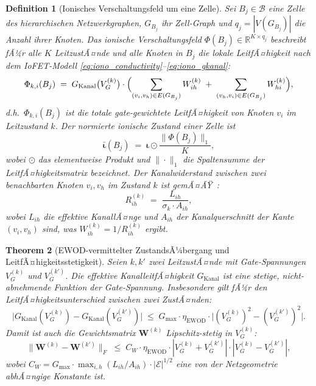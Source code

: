 ﻿\documentclass[12pt, a4paper, openany]{report}
\newtheorem{theorem}{Theorem}[chapter]
\newtheorem{definition}[theorem]{Definition}
\newcommand{\R}{\mathbb{R}}
\newcommand{\calE}{\mathcal{E}}
\newcommand{\calB}{\mathcal{B}}
\begin{document}
\begin{definition}[Ionisches Verschaltungsfeld um eine Zelle]
\label{def:ionic_field}
Sei $B_j \in \calB$ eine Zelle des hierarchischen Netzwerkgraphen,
$G_{B_j}$ ihr Zell-Graph und $q_j = |V(G_{B_j})|$ die Anzahl ihrer Knoten.
Das \emph{ionische Verschaltungsfeld}
$\Phi(B_j) \in \R^{K \times q_j}$ beschreibt fÃ¼r alle $K$ LeitzustÃ¤nde
und alle Knoten in $B_j$ die lokale LeitfÃ¤higkeit nach dem IoFET-Modell
\eqref{eq:iono_conductivity}--\eqref{eq:iono_gkanal}:
\[
  \Phi_{k,i}(B_j)
  \;=\;
  G_{\mathrm{Kanal}}\bigl(V_G^{(k)}\bigr) \cdot
  \Bigl(
    \sum_{(v_i, v_h) \in E(G_{B_j})} W^{(k)}_{ih}
    \;+\;
    \sum_{(v_h, v_i) \in E(G_{B_j})} W^{(k)}_{hi}
  \Bigr),
\]
d.h.\ $\Phi_{k,i}(B_j)$ ist die totale gate-gewichtete LeitfÃ¤higkeit
von Knoten $v_i$ im Leitzustand $k$.  Der normierte ionische Zustand
einer Zelle ist
\[
  \bar{\bm{\iota}}(B_j)
  \;=\; \bm{\iota} \odot \frac{\|\Phi(B_j)\|_1}{K},
\]
wobei $\odot$ das elementweise Produkt und $\|\cdot\|_1$ die Spaltensumme
der LeitfÃ¤higkeitsmatrix bezeichnet.  Der Kanalwiderstand zwischen zwei
benachbarten Knoten $v_i, v_h$ im Zustand $k$ ist gemÃ¤ÃŸ~\cite{epp2026iono}:
\begin{equation}
  \label{eq:ionic_channel_resistance}
  R^{(k)}_{ih}
  \;=\; \frac{L_{ih}}{\sigma_k \cdot A_{ih}},
\end{equation}
wobei $L_{ih}$ die effektive KanallÃ¤nge und $A_{ih}$ der Kanalquerschnitt
der Kante $(v_i, v_h)$ sind, was $W^{(k)}_{ih} = 1 / R^{(k)}_{ih}$
ergibt.
\end{definition}

\begin{theorem}[EWOD-vermittelter ZustandsÃ¼bergang und LeitfÃ¤higkeitsstetigkeit]
\label{thm:ionic_ewod_continuity}
Seien $k, k'$ zwei LeitzustÃ¤nde mit Gate-Spannungen $V_G^{(k)}$ und
$V_G^{(k')}$.  Die effektive KanalleitfÃ¤higkeit $G_{\mathrm{Kanal}}$ ist
eine stetige, nicht-abnehmende Funktion der Gate-Spannung.  Insbesondere
gilt fÃ¼r den LeitfÃ¤higkeitsunterschied zwischen zwei ZustÃ¤nden:
\begin{equation}
  \label{eq:ionic_ewod_diff}
  \bigl|G_{\mathrm{Kanal}}(V_G^{(k)}) - G_{\mathrm{Kanal}}(V_G^{(k')})\bigr|
  \;\leq\;
  G_{\max} \cdot \eta_{\mathrm{EWOD}} \cdot
  \bigl|(V_G^{(k)})^2 - (V_G^{(k')})^2\bigr|.
\end{equation}
Damit ist auch die Gewichtsmatrix $\bm{W}^{(k)}$ Lipschitz-stetig in $V_G^{(k)}$:
\begin{equation}
  \label{eq:ionic_w_lipschitz_vg}
  \|\bm{W}^{(k)} - \bm{W}^{(k')}\|_F
  \;\leq\;
  C_W \cdot \eta_{\mathrm{EWOD}} \cdot |V_G^{(k)} + V_G^{(k')}| \cdot
  |V_G^{(k)} - V_G^{(k')}|,
\end{equation}
wobei $C_W = G_{\max} \cdot \max_{i,h} (L_{ih}/A_{ih}) \cdot |\calE|^{1/2}$
eine von der Netzgeometrie abhÃ¤ngige Konstante ist.
\end{theorem}
\end{document}

